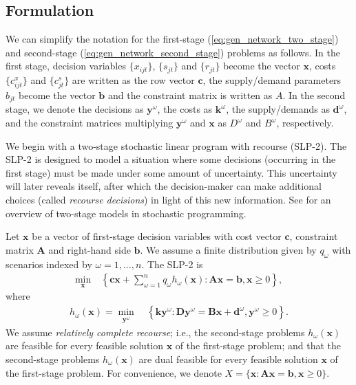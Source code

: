 \documentclass[opre,nonblindrev]{informs3} %
\newcommand{\x}{\mathbf{x}}
\newcommand{\y}{\mathbf{y}}
\renewcommand{\c}{\mathbf{c}}
\newcommand{\A}{\mathbf{A}}
\renewcommand{\b}{\mathbf{b}}
\renewcommand{\k}{\mathbf{k}}
\newcommand{\D}{\mathbf{D}}
\newcommand{\B}{\mathbf{B}}
\renewcommand{\d}{\mathbf{d}}
\begin{document}
\subsection{Formulation}
\label{ssec:form}

We can simplify the notation for the first-stage (\ref{eq:gen_network_two_stage}) and second-stage (\ref{eq:gen_network_second_stage}) problems as follows.
In the first stage, decision variables $\{x_{ijt}\}$, $\{s_{jt}\}$ and $\{r_{jt}\}$ become the vector $\x$, costs $\{c_{ijt}^x\}$ and $\{c_{jt}^s\}$ are written as the row vector $\c$, the supply/demand parameters $b_{jt}$ become the vector $\b$ and the constraint matrix is written as $A$.
In the second stage, we denote the decisions as $\y^\omega$, the costs as $\k^\omega$, the supply/demands as $\d^\omega$, and the constraint matrices multiplying $\y^\omega$ and $\x$ as $D^\omega$ and $B^\omega$, respectively.

We begin with a two-stage stochastic linear program with recourse (SLP-2).
The SLP-2 is designed to model a situation where some decisions (occurring in the first stage) must be made under some amount of uncertainty.
This uncertainty will later reveals itself, after which the decision-maker can make additional choices (called \emph{recourse decisions}) in light of this new information.
See \citep{ruszczynski2003stochastic} for an overview of two-stage models in stochastic programming.

Let $\x$ be a vector of first-stage decision variables with cost vector $\c$, constraint matrix $\A$ and right-hand side $\b$.
We assume a finite distribution given by $q_\omega$ with scenarios indexed by $\omega = 1, \dots, n$.
The SLP-2 is
\begin{align}
	\min_\x \ & \left\{ \c\x + \sum_{\omega=1}^n q_\omega h_\omega(\x) : \A\x = \b, \x \geq 0 \right\}, \label{eq:slp_first_stage}
\end{align}
where
\begin{align}
	h_\omega(\x) = \min_{\y^\omega} \ & \left\{ \k \y^\omega : \D \y^\omega = \B \x + \d^\omega, \y^\omega \geq 0 \right\}. \label{eq:slp_second_stage}
\end{align}
We assume \emph{relatively complete recourse}; i.e., the second-stage problems $h_\omega(\x)$ are feasible for every feasible solution $\x$ of the first-stage problem; and that the second-stage problems $h_\omega(\x)$ are dual feasible for every feasible solution $\x$ of the first-stage problem.
For convenience, we denote $X = \{\x : \A\x = \b, \x \geq 0\}$.
\end{document}
